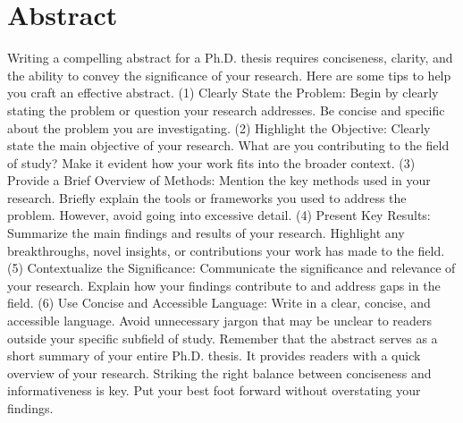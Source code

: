 \chapter*{Abstract}

Writing a compelling abstract for a Ph.D. thesis requires conciseness, clarity, and the ability to convey the significance of your research. Here are some tips to help you craft an effective abstract.
(1) Clearly State the Problem:
Begin by clearly stating the problem or question your research addresses.
Be concise and specific about the problem you are investigating.
(2) Highlight the Objective:
Clearly state the main objective of your research.
What are you contributing to the field of study?
Make it evident how your work fits into the broader context.
(3) Provide a Brief Overview of Methods:
Mention the key methods used in your research.
Briefly explain the tools or frameworks you used to address the problem.
However, avoid going into excessive detail.
(4) Present Key Results:
Summarize the main findings and results of your research. 
Highlight any breakthroughs, novel insights, or contributions your work has made to the field.
(5) Contextualize the Significance:
Communicate the significance and relevance of your research. 
Explain how your findings contribute to and address gaps in the field.
(6) Use Concise and Accessible Language:
Write in a clear, concise, and accessible language.
Avoid unnecessary jargon that may be unclear to readers outside your specific subfield of study.
Remember that the abstract serves as a short summary of your entire Ph.D. thesis.
It provides readers with a quick overview of your research. Striking the right balance between conciseness and informativeness is key.
Put your best foot forward without overstating your findings.
